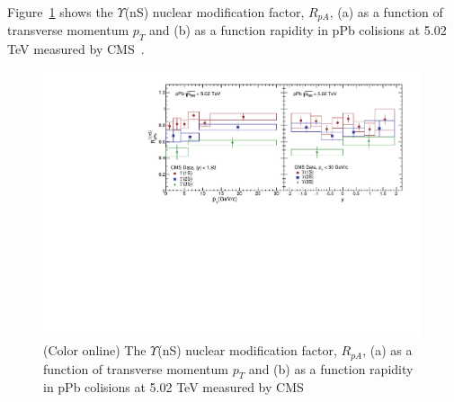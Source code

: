 

Figure~\ref{fig:LHCpPb5} shows the $\Upsilon$(nS) nuclear modification factor, $R_{pA}$,
      (a) as a function of transverse momentum $p_{T}$
    and (b) as a function rapidity in pPb colisions at 5.02 TeV measured by CMS~\cite{CMS:2022wfi}.


\begin{figure}
  \includegraphics[width=0.99\textwidth]{Figures/ExpOverview/Fig_LHC_YnSRPPbPtRap.pdf}
     \caption{(Color online) The $\Upsilon$(nS) nuclear modification factor, $R_{pA}$,
      (a) as a function of transverse momentum $p_{T}$
    and (b) as a function rapidity in pPb colisions at 5.02 TeV measured by CMS~\cite{CMS:2022wfi}
  }
  \label{fig:LHCpPb5}
\end{figure}






